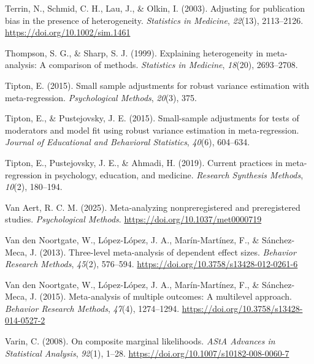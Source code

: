 \documentclass[
  man, donotrepeattitle,floatsintext]{apa7}
\newlength{\cslhangindent}
\newenvironment{CSLReferences}[2] %
 {\begin{list}{}{%
  \setlength{\itemindent}{0pt}
  \setlength{\leftmargin}{0pt}
  \setlength{\parsep}{0pt}
  \ifodd #1
   \setlength{\leftmargin}{\cslhangindent}
   \setlength{\itemindent}{-1\cslhangindent}
  \fi
  \setlength{\itemsep}{#2\baselineskip}}}
 {\end{list}}
\begin{document}
\begin{CSLReferences}{1}{0}
Terrin, N., Schmid, C. H., Lau, J., \& Olkin, I. (2003). Adjusting for publication bias in the presence of heterogeneity. \emph{Statistics in Medicine}, \emph{22}(13), 2113--2126. \url{https://doi.org/10.1002/sim.1461}

Thompson, S. G., \& Sharp, S. J. (1999). Explaining heterogeneity in meta-analysis: A comparison of methods. \emph{Statistics in Medicine}, \emph{18}(20), 2693--2708.

Tipton, E. (2015). Small sample adjustments for robust variance estimation with meta-regression. \emph{Psychological Methods}, \emph{20}(3), 375.

Tipton, E., \& Pustejovsky, J. E. (2015). Small-sample adjustments for tests of moderators and model fit using robust variance estimation in meta-regression. \emph{Journal of Educational and Behavioral Statistics}, \emph{40}(6), 604--634.

Tipton, E., Pustejovsky, J. E., \& Ahmadi, H. (2019). Current practices in meta-regression in psychology, education, and medicine. \emph{Research Synthesis Methods}, \emph{10}(2), 180--194.

Van Aert, R. C. M. (2025). Meta-analyzing nonpreregistered and preregistered studies. \emph{Psychological Methods}. \url{https://doi.org/10.1037/met0000719}

Van den Noortgate, W., López-López, J. A., Marín-Martínez, F., \& Sánchez-Meca, J. (2013). Three-level meta-analysis of dependent effect sizes. \emph{Behavior Research Methods}, \emph{45}(2), 576--594. \url{https://doi.org/10.3758/s13428-012-0261-6}

Van den Noortgate, W., López-López, J. A., Marín-Martínez, F., \& Sánchez-Meca, J. (2015). Meta-analysis of multiple outcomes: A multilevel approach. \emph{Behavior Research Methods}, \emph{47}(4), 1274--1294. \url{https://doi.org/10.3758/s13428-014-0527-2}

Varin, C. (2008). On composite marginal likelihoods. \emph{AStA Advances in Statistical Analysis}, \emph{92}(1), 1--28. \url{https://doi.org/10.1007/s10182-008-0060-7}


\end{CSLReferences}
\end{document}
